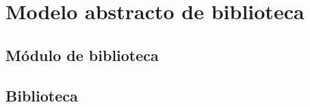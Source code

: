 \section{Modelo abstracto de biblioteca}
\label{sec:modelLibrary}

\subsection{Módulo de biblioteca}

\subsection{Biblioteca}
